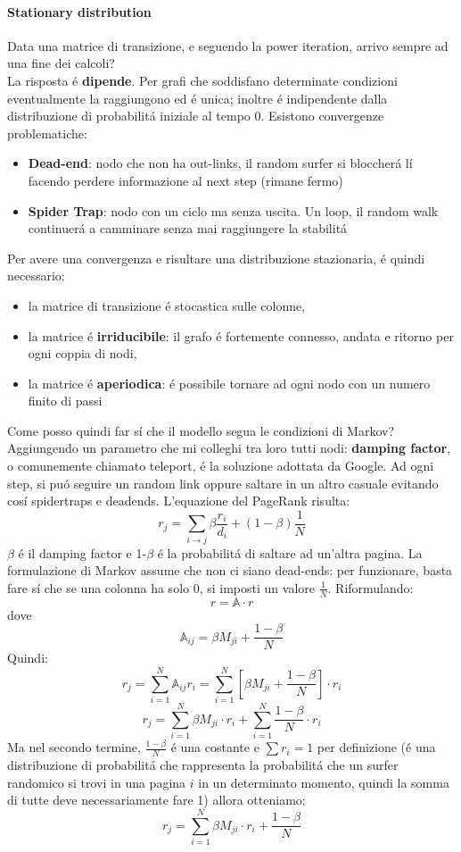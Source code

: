 \paragraph{Stationary distribution} Data una matrice di transizione, e seguendo la power iteration, arrivo sempre ad una fine dei calcoli?
\\
La risposta é \textbf{dipende}. Per grafi che soddisfano determinate condizioni eventualmente la raggiungono ed é unica; inoltre é indipendente dalla distribuzione di probabilitá iniziale al tempo 0. Esistono convergenze problematiche:
\begin{itemize}
    \item \textbf{Dead-end}: nodo che non ha out-links, il random surfer si bloccherá lí facendo perdere informazione al next step (rimane fermo)
    \item \textbf{Spider Trap}: nodo con un ciclo ma senza uscita. Un loop, il random walk continuerá a camminare senza mai raggiungere la stabilitá
\end{itemize}
Per avere una convergenza e risultare una distribuzione stazionaria, é quindi necessario:
\begin{itemize}
    \item la matrice di transizione é stocastica sulle colonne,
    \item la matrice é \textbf{irriducibile}: il grafo é fortemente connesso, andata e ritorno per ogni coppia di nodi,
    \item la matrice é \textbf{aperiodica}: é possibile tornare ad ogni nodo con un numero finito di passi
\end{itemize}
Come posso quindi far sí che il modello segua le condizioni di Markov? Aggiungendo un parametro che mi colleghi tra loro tutti nodi: \textbf{damping factor}, o comunemente chiamato teleport, é la soluzione adottata da Google. Ad ogni step, si puó seguire un random link oppure saltare in un altro casuale evitando cosí spidertraps e deadends. L'equazione del PageRank risulta:
\[
r_j = \sum_{i \rightarrow j} \beta \frac{r_i}{d_i} + (1-\beta)\frac{1}{N}
\]
$\beta$ é il damping factor e 1-$\beta$ é la probabilitá di saltare ad un'altra pagina. La formulazione di Markov assume che non ci siano dead-ends: per funzionare, basta fare sí che se una colonna ha solo 0, si imposti un valore $\frac{1}{N}$. Riformulando:
\[
r = \mathbb{A} \cdot r
\]
dove
\[
\mathbb{A}_{ij} = \beta M_{ji} + \frac{1 - \beta}{N}
\]
Quindi:
\[
r_j=\sum_{i=1}^N \mathbb{A}_{ij}r_i = \sum_{i=1}^N [\beta M_{ji} + \frac{1 - \beta}{N}] \cdot r_i
\]
\[
r_j = \sum_{i=1}^N \beta M_{ji} \cdot r_i + \sum_{i=1}^N\frac{1 - \beta}{N} \cdot r_i
\]
Ma nel secondo termine, $\frac{1 - \beta}{N}$ é una costante e $\sum r_i = 1$ per definizione (é una distribuzione di probabilitá che rappresenta la probabilitá che un surfer randomico si trovi in una pagina $i$ in un determinato momento, quindi la somma di tutte deve necessariamente fare 1) allora otteniamo:
\[
r_j = \sum_{i=1}^N \beta M_{ji} \cdot r_i + \frac{1 - \beta}{N}
\]
\newpage
